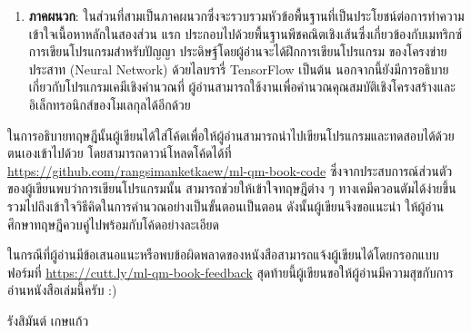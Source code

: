 {\begin{enumerate}[topsep=0pt]
    \item \textbf{ภาคผนวก}: ในส่วนที่สามเป็นภาคผนวกซึ่งจะรวบรวมหัวข้อพื้นฐานที่เป็นประโยชน์ต่อการทำความเข้าใจเนื้อหาหลักในสองส่วน%
    แรก ประกอบไปด้วยพื้นฐานพีชคณิตเชิงเส้นซึ่งเกี่ยวข้องกับเมทริกซ์ การเขียนโปรแกรมสำหรับปัญญา ประดิษฐ์โดยผู้อ่านจะได้ฝึกการเขียนโปรแกรม%
    ของโครงข่ายประสาท (Neural Network) ด้วยไลบรารี่ TensorFlow เป็นต้น นอกจากนี้ยังมีการอธิบายเกี่ยวกับโปรแกรมเคมีเชิงคำนวณที่%
    ผู้อ่านสามารถใช้งานเพื่อคำนวณคุณสมบัติเชิงโครงสร้างและอิเล็กทรอนิกส์ของโมเลกุลได้อีกด้วย
\end{enumerate}

ในการอธิบายทฤษฎีนั้นผู้เขียนได้ใส่โค้ดเพื่อให้ผู้อ่านสามารถนำไปเขียนโปรแกรมและทดสอบได้ด้วยตนเองเข้าไปด้วย โดยสามารถดาวน์โหลดโค้ดได้ที่ 
\url{https://github.com/rangsimanketkaew/ml-qm-book-code} ซึ่งจากประสบการณ์ส่วนตัวของผู้เขียนพบว่าการเขียนโปรแกรมนั้น%
สามารถช่วยให้เข้าใจทฤษฎีต่าง ๆ ทางเคมีควอนตัมได้ง่ายขึ้น รวมไปถึงเข้าใจวิธีคิดในการคำนวณอย่างเป็นขั้นตอนเป็นตอน ดังนั้นผู้เขียนจึงขอแนะนำ%
ให้ผู้อ่านศึกษาทฤษฎีควบคู่ไปพร้อมกับโค้ดอย่างละเอียด

ในกรณีที่ผู้อ่านมีข้อเสนอแนะหรือพบข้อผิดพลาดของหนังสือสามารถแจ้งผู้เขียนได้โดยกรอกแบบฟอร์มที่ 
\url{https://cutt.ly/ml-qm-book-feedback} สุดท้ายนี้ผู้เขียนขอให้ผู้อ่านมีความสุขกับการอ่านหนังสือเล่มนี้ครับ :)

\medskip

\begin{flushright}
รังสิมันต์ เกษแก้ว
\end{flushright}
}
